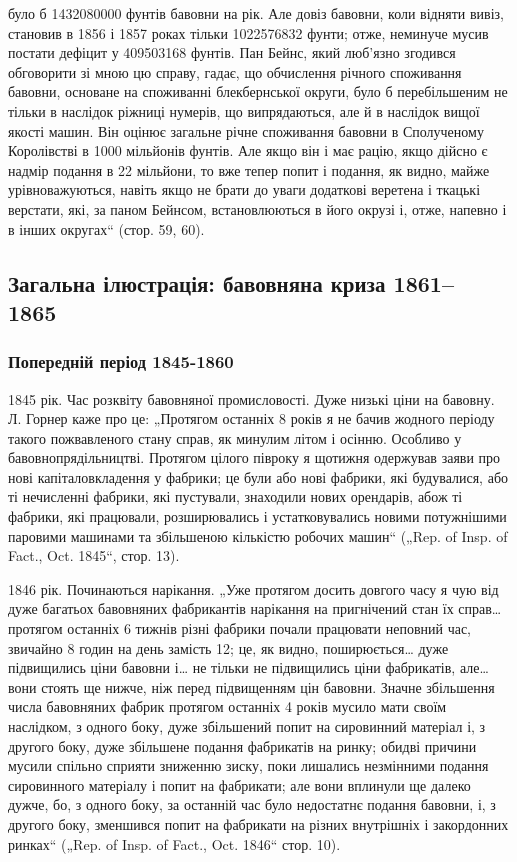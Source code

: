 \parcont{}  %
було б 1432080000 фунтів бавовни на рік. Але довіз бавовни,
коли відняти вивіз, становив в 1856 і 1857 роках тільки
1022576832 фунти; отже, неминуче мусив постати дефіцит
у 409503168 фунтів. Пан Бейнс, який люб’язно згодився обговорити
зі мною цю справу, гадає, що обчислення річного споживання
бавовни, основане на споживанні блекбернської округи,
було б перебільшеним не тільки в наслідок ріжниці нумерів, що
випрядаються, але й в наслідок вищої якості машин. Він оцінює загальне
річне споживання бавовни в Сполученому Королівстві в
1000 мільйонів фунтів. Але якщо він і має рацію, якщо дійсно
є надмір подання в 22  мільйони, то вже тепер попит і подання,
як видно, майже урівноважуються, навіть якщо не брати до
уваги додаткові веретена і ткацькі верстати, які, за паном
Бейнсом, встановлюються в його окрузі і, отже, напевно і
в інших округах“ (стор. 59, 60).

\subsection{Загальна ілюстрація: бавовняна криза 1861--1865~}

\subsubsection{Попередній період 1845-1860~}

1845 рік. Час розквіту бавовняної промисловості. Дуже низькі
ціни на бавовну. Л. Горнер каже про це: „Протягом останніх
8 років я не бачив жодного періоду такого пожвавленого стану
справ, як минулим літом і осінню. Особливо у бавовнопрядільництві.
Протягом цілого півроку я щотижня одержував заяви
про нові капіталовкладення у фабрики; це були або нові фабрики,
які будувалися, або ті нечисленні фабрики, які пустували, знаходили
нових орендарів, абож ті фабрики, які працювали, розширювались
і устатковувались новими потужнішими паровими машинами
та збільшеною кількістю робочих машин“ („Rep. of Insp.
of Fact., Oct. 1845“, стор. 13).

1846 рік. Починаються нарікання. „Уже протягом досить довгого
часу я чую від дуже багатьох бавовняних фабрикантів нарікання
на пригнічений стан їх справ\dots{} протягом останніх 6 тижнів
різні фабрики почали працювати неповний час, звичайно
8 годин на день замість 12; це, як видно, поширюється\dots{} дуже
підвищились ціни бавовни і\dots{} не тільки не підвищились ціни
фабрикатів, але\dots{} вони стоять ще нижче, ніж перед підвищенням
цін бавовни. Значне збільшення числа бавовняних фабрик
протягом останніх 4 років мусило мати своїм наслідком,
з одного боку, дуже збільшений попит на сировинний матеріал
і, з другого боку, дуже збільшене подання фабрикатів на ринку;
обидві причини мусили спільно сприяти зниженню зиску, поки
лишались незмінними подання сировинного матеріалу і попит
на фабрикати; але вони вплинули ще далеко дужче, бо, з одного
боку, за останній час було недостатнє подання бавовни,
і, з другого боку, зменшився попит на фабрикати на різних
внутрішніх і закордонних ринках“ („Rep. of Insp. of Fact., Oct.
1846“ стор. 10).
